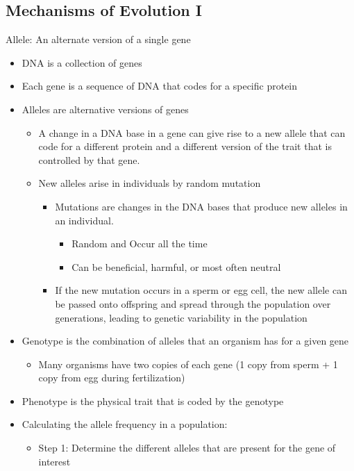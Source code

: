 \documentclass[10pt, oneside]{article}
\begin{document}
\subsection{Mechanisms of Evolution I}

 Allele: An alternate version of a single gene


\begin{itemize}
\item DNA is a collection of genes


\item Each gene is a sequence of DNA that codes for a specific protein
\item Alleles are alternative versions of genes
\begin{itemize}
\item A change in a DNA base in a gene can give rise to a new allele that can code for a different protein and a different version of the trait that is controlled by that gene.
\item New alleles arise in individuals by random mutation
\begin{itemize}
\item Mutations are changes in the DNA bases that produce new alleles in an individual.
\begin{itemize}
\item Random and Occur all the time
\item Can be beneficial, harmful, or most often neutral
\end{itemize}
\item If the new mutation occurs in a sperm or egg cell, the new allele can be passed onto offspring and spread through the population over generations, leading to genetic variability in the population
\end{itemize}
\end{itemize}
\item Genotype is the combination of alleles that an organism has for a given gene
\begin{itemize}
\item Many organisms have two copies of each gene (1 copy from sperm + 1 copy from egg during fertilization)
\end{itemize}
\item Phenotype is the physical trait that is coded by the genotype
\item Calculating the allele frequency in a population:
\begin{itemize}
\item Step 1: Determine the different alleles that are present for the gene of interest

\end{itemize}
\end{itemize}
\end{document}
